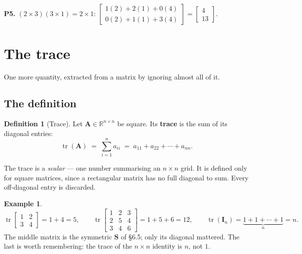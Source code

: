 \documentclass[11pt]{article}
\theoremstyle{plain}
\theoremstyle{definition}
\newtheorem{defn}{Definition}[section]
\newtheorem{ex}{Example}[section]
\theoremstyle{remark}
\newcommand{\R}{\mathbb{R}}
\newcommand{\mt}[1]{\mathbf{#1}}        %
\begin{document}
\smallskip
\noindent\textbf{P5.} $(2\times3)(3\times1)=2\times1$:
$\begin{bmatrix}1(2)+2(1)+0(4)\\0(2)+1(1)+3(4)\end{bmatrix}
 =\begin{bmatrix}4\\13\end{bmatrix}$.

\section{The trace}
One more quantity, extracted from a matrix by ignoring almost all of it.

\subsection{The definition}
\begin{defn}[Trace]
Let $\mt{A}\in\R^{n\times n}$ be square. Its \textbf{trace} is the sum of its
diagonal entries:
\[
  \operatorname{tr}(\mt{A}) \;=\; \sum_{i=1}^{n} a_{ii}
  \;=\; a_{11}+a_{22}+\cdots+a_{nn} .
\]
\end{defn}

\noindent The trace is a \emph{scalar} --- one number summarising an $n\times n$
grid. It is defined only for square matrices, since a rectangular matrix has no
full diagonal to sum. Every off-diagonal entry is discarded.

\begin{ex}
\[
  \operatorname{tr}\begin{bmatrix}1&2\\3&4\end{bmatrix}=1+4=5,
  \qquad
  \operatorname{tr}\begin{bmatrix}1&2&3\\2&5&4\\3&4&6\end{bmatrix}=1+5+6=12,
  \qquad
  \operatorname{tr}(\mt{I}_n)=\underbrace{1+1+\cdots+1}_{n}=n .
\]
The middle matrix is the symmetric $\mt{S}$ of \S6.5; only its diagonal
mattered. The last is worth remembering: the trace of the $n\times n$ identity
is $n$, not $1$.
\end{ex}
\end{document}
